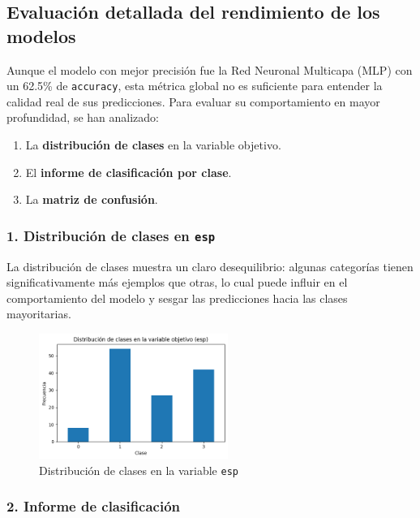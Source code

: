 \documentclass[11pt,a4paper]{article}
\begin{document}
\subsection{Evaluación detallada del rendimiento de los modelos}

Aunque el modelo con mejor precisión fue la Red Neuronal Multicapa (MLP) con un 62.5\% de \texttt{accuracy}, esta métrica global no es suficiente para entender la calidad real de sus predicciones. Para evaluar su comportamiento en mayor profundidad, se han analizado:

\begin{enumerate}
    \item La \textbf{distribución de clases} en la variable objetivo.
    \item El \textbf{informe de clasificación por clase}.
    \item La \textbf{matriz de confusión}.
\end{enumerate}

\subsubsection*{1. Distribución de clases en \texttt{esp}}

La distribución de clases muestra un claro desequilibrio: algunas categorías tienen significativamente más ejemplos que otras, lo cual puede influir en el comportamiento del modelo y sesgar las predicciones hacia las clases mayoritarias.

\vspace{0.5cm}
\begin{figure}[H]
\centering
\includegraphics[width=0.55\textwidth]{img/distribucion_clases_esp.png}
\caption*{Distribución de clases en la variable \texttt{esp}}
\end{figure}
\vspace{0.5cm}

\subsubsection*{2. Informe de clasificación}
\end{document}
